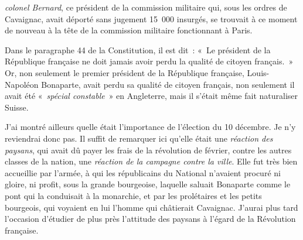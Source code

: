 \documentclass[french,twoside]{book} %
\begin{document}
\emph{colonel Bernard}, ce président de la commission militaire qui, sous les ordres de Cavaignac, avait déporté sans jugement 15 000 insurgés, se trouvait à ce moment de nouveau à la tête de la commission militaire fonctionnant à Paris.\par
Dans le paragraphe 44 de la Constitution, il est dit : « Le président de la République française ne doit jamais avoir perdu la qualité de citoyen français. » Or, non seulement le premier président de la République française, Louis-Napoléon Bonaparte, avait perdu sa qualité de citoyen français, non seulement il avait été « \emph{spécial constable} » en Angleterre, mais il s’était même fait naturaliser Suisse.\par
J’ai montré ailleurs quelle était l’importance de l’élection du 10 décembre. Je n’y reviendrai donc pas. Il suffit de remarquer ici qu’elle était une \emph{réaction des paysans}, qui avait dû payer les frais de la révolution de février, contre les autres classes de la nation, une \emph{réaction de la campagne contre la ville}. Elle fut très bien accueillie par l’armée, à qui les républicains du National n’avaient procuré ni gloire, ni profit, sous la grande bourgeoise, laquelle saluait Bonaparte comme le pont qui la conduisait à la monarchie, et par les prolétaires et les petits bourgeois, qui voyaient en lui l’homme qui châtierait Cavaignac. J’aurai plus tard l’occasion d’étudier de plus près l’attitude des paysans à l’égard de la Révolution française.\par
\end{document}
